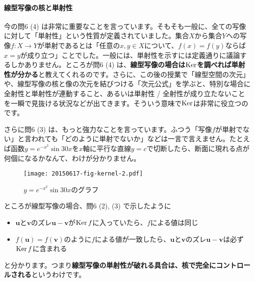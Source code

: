 \paragraph{線型写像の核と単射性}

今の問6 (4) は非常に重要なことを言っています。そもそも一般に、全ての写像に対して「単射性」という性質が定義されていました。集合$X$から集合$Y$への写像$f\colon X\rightarrow Y$が単射であるとは「任意の$x, y\in X$について、$f(x) = f(y)$ならば$x = y$が成り立つ」ことでした。一般には、単射性を示すには定義通りに議論するしかありません。ところが問6 (4) は、\textbf{線型写像の場合は$\operatorname{Ker}$を調べれば単射性が分かる}と教えてくれるのです。さらに、この後の授業で「線型空間の次元」や、線型写像の核と像の次元を結びつける「次元公式」を学ぶと、特別な場合に全射性と単射性が連動すること、あるいは単射性 / 全射性が成り立たないことを一瞬で見抜ける状況などが出てきます。そういう意味で$\operatorname{Ker}$は非常に役立つのです。

さらに問6 (3) は、もっと強力なことを言っています。ふつう「写像$f$が単射でない」と言われても「どのように単射でないか」などは一言で言えません。たとえば函数$y = e^{-x^2}\sin 30x$を$x$軸に平行な直線$y = c$で切断したら、断面に現れる点が何個になるかなんて、わけが分かりません。
\begin{figure}[h!tbp]
\centering
\texttt{[image: 20150617-fig-kernel-2.pdf]}
\caption{$y = e^{-x^2}\sin 30x$のグラフ}
\end{figure}

ところが線型写像の場合、問6 (2), (3) で示したように
\begin{itemize}
\item $\bm{u}$と$\bm{v}$のズレ$\bm{u} - \bm{v}$が$\operatorname{Ker} f$に入っていたら、$f$による値は同じ
\item $f(\bm{u}) = f(\bm{v})$のように$f$による値が一致したら、$\bm{u}$と$\bm{v}$のズレ$\bm{u} - \bm{v}$は必ず$\operatorname{Ker} f$に含まれる
\end{itemize}
と分かります。つまり\textbf{線型写像の単射性が破れる具合は、核で完全にコントロールされる}というわけです。

